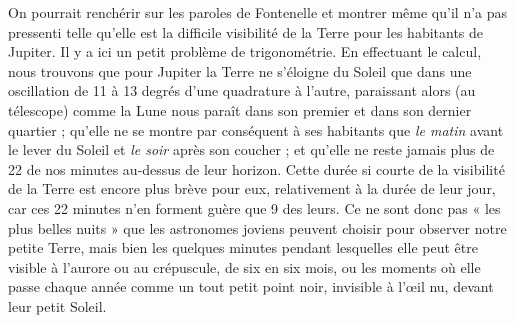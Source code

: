 \documentclass[a4paper, 11pt, oneside, landscape]{article}
\begin{document}
On pourrait renchérir sur les paroles de Fontenelle et montrer même qu'il n'a pas pressenti telle qu'elle est la difficile visibilité de la Terre pour les habitants de Jupiter. Il y a ici un petit problème de trigonométrie. En effectuant le calcul, nous trouvons que pour Jupiter la Terre ne s'éloigne du Soleil que dans une oscillation de 11 à 13 degrés d'une quadrature à l'autre, paraissant alors (au télescope) comme la Lune nous paraît dans son premier et dans son dernier quartier ; qu'elle ne se montre par conséquent à ses habitants que \emph{le matin} avant le lever du Soleil et \emph{le soir} après son coucher ; et qu'elle ne reste jamais plus de 22 de nos minutes au-dessus de leur horizon. Cette durée si courte de la visibilité de la Terre est encore plus brève pour eux, relativement à la durée de leur jour, car ces 22 minutes n'en forment guère que 9 des leurs. Ce ne sont donc pas « les plus belles nuits » que les astronomes joviens peuvent choisir pour observer notre petite Terre, mais bien les quelques minutes pendant lesquelles elle peut être visible à l'aurore ou au crépuscule, de six en six mois, ou les moments où elle passe chaque année comme un tout petit point noir, invisible à l'œil nu, devant leur petit Soleil.
\end{document}
